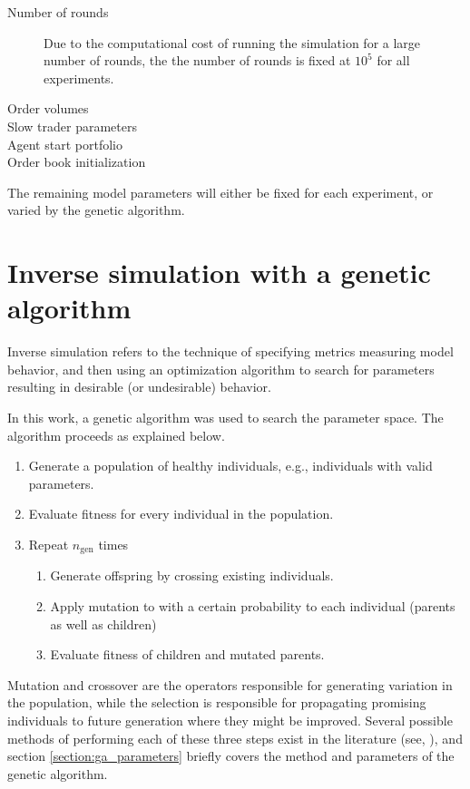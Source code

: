 \begin{description}
	\item [Number of rounds] Due to the computational cost of running the simulation for a large number of rounds, the the number of rounds is fixed at $10^5$ for all experiments.
	\item [Order volumes] 
	\item[Slow trader parameters]
	\item[Agent start portfolio]
	\item[Order book initialization]
\end{description}

The remaining model parameters will either be fixed for each experiment, or varied by the genetic algorithm. 



\section{Inverse simulation with a genetic algorithm}\label{section:genetic_algorithm}
Inverse simulation refers to the technique of specifying metrics measuring model behavior, and then using an optimization algorithm to search for parameters resulting in desirable (or undesirable) behavior. 

In this work, a genetic algorithm was used to search the parameter space. The algorithm proceeds as explained below.
\begin{enumerate}
	\item Generate a population of healthy individuals, e.g., individuals with valid parameters.
	\item Evaluate fitness for every individual in the population.
	\item Repeat $n_\text{gen}$ times 
	\begin{enumerate}
		\item Generate offspring by crossing existing individuals.
		\item Apply mutation to with a certain probability to each individual (parents as well as children)
		\item Evaluate fitness of children and mutated parents.
	\end{enumerate}
\end{enumerate}

Mutation and crossover are the operators responsible for generating variation in the population, while the selection is responsible for propagating promising individuals to future generation where they might be improved. Several possible methods of performing each of these three steps exist in the literature (see\cite{genetic1}, \cite{genetic2}), and section \ref{section:ga_parameters} briefly covers the method and parameters of the genetic algorithm.

